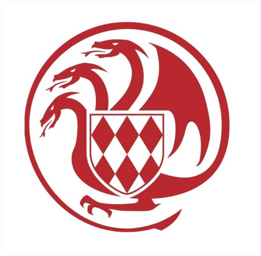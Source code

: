 \documentclass[a4paper, oneside, 12pt, final]{extreport}
\begin{document}
\begin{titlepage}
\begin{center}
\includegraphics[scale=0.15]{assets/LogoAMSN.jpg}
\end{center}
\end{titlepage}

%
\end{document}

